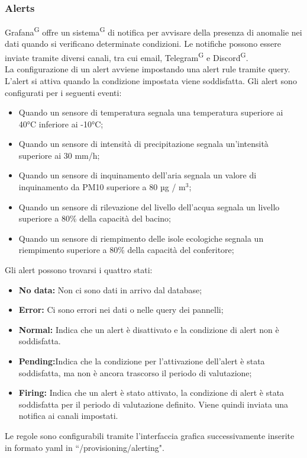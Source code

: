 \documentclass[8pt]{article}
\newcommand{\glossterm}[1]{#1\textsuperscript{G}} %
\begin{document}
\subsubsection{Alerts}
\glossterm{Grafana} offre un \glossterm{sistema} di notifica per avvisare della presenza di anomalie nei dati quando si verificano determinate condizioni. Le notifiche possono essere inviate tramite diversi canali, tra cui email, \glossterm{Telegram} e \glossterm{Discord}.
\\La configurazione di un alert avviene impostando una alert rule tramite query. L’alert si attiva quando la condizione impostata viene soddisfatta. Gli alert sono configurati per i seguenti eventi:
\begin{itemize}
    \item Quando un sensore di temperatura segnala una temperatura superiore ai 40°C  inferiore ai -10°C;
    \item Quando un sensore di intensità di precipitazione segnala un'intensità superiore ai 30 mm/h;
    \item Quando un sensore di inquinamento dell'aria segnala un valore di inquinamento da PM10 superiore a 80 µg / $\mbox{m}^{\mbox{3}}$;
    \item Quando un sensore di rilevazione del livello dell'acqua segnala un livello superiore a 80\% della capacità del bacino;
    \item Quando un sensore di riempimento delle isole ecologiche segnala un riempimento superiore a 80\% della capacità del conferitore;
\end{itemize}
Gli alert possono trovarsi i quattro stati:
\begin{itemize}
    \item \textbf{No data:} Non ci sono dati in arrivo dal database;
    \item \textbf{Error:} Ci sono errori nei dati o nelle query dei pannelli;
    \item \textbf{Normal:} Indica che un alert è disattivato e la condizione di alert non è soddisfatta.
    \item \textbf{Pending:}Indica che la condizione per l’attivazione dell’alert è stata soddisfatta, ma non è ancora trascorso il periodo di valutazione;
    \item \textbf{Firing:} Indica che un alert è stato attivato, la condizione di alert è stata soddisfatta per il periodo di valutazione definito. Viene quindi inviata una notifica ai canali impostati.
\end{itemize}
Le regole sono configurabili tramite l’interfaccia grafica successivamente inserite in formato yaml in ``/provisioning/alerting".
\end{document}
